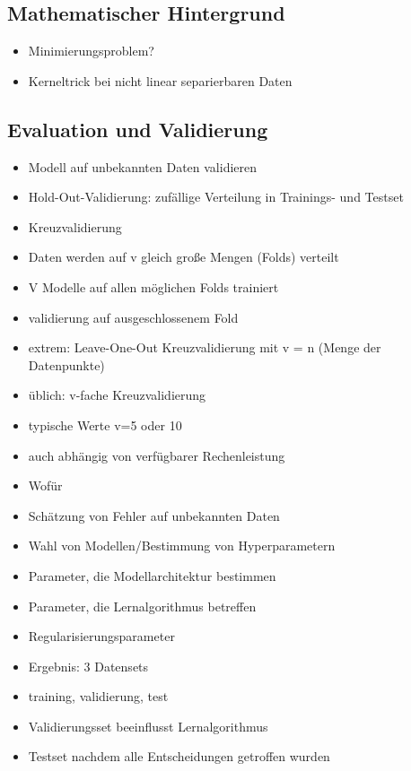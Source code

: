 	\subsection{Mathematischer Hintergrund}
	
	\begin{itemize}
		\item Minimierungsproblem?
		\item Kerneltrick bei nicht linear separierbaren Daten
	\end{itemize}
	
	\subsection{Evaluation und Validierung}
	
	\begin{itemize}
		\item Modell auf unbekannten Daten validieren
		\item Hold-Out-Validierung: zufällige Verteilung in Trainings- und Testset
		\item Kreuzvalidierung
		\item Daten werden auf v gleich große Mengen (Folds) verteilt
		\item V Modelle auf allen möglichen Folds trainiert
		\item validierung auf ausgeschlossenem Fold
		\item extrem: Leave-One-Out Kreuzvalidierung mit v = n (Menge der Datenpunkte)
		\item üblich: v-fache Kreuzvalidierung
		\item typische Werte v=5 oder 10
		\item auch abhängig von verfügbarer Rechenleistung
		\item Wofür
		\item Schätzung von Fehler auf unbekannten Daten
		\item Wahl von Modellen/Bestimmung von Hyperparametern
		\item Parameter, die Modellarchitektur bestimmen
		\item Parameter, die Lernalgorithmus betreffen
		\item Regularisierungsparameter
		\item Ergebnis: 3 Datensets
		\item training, validierung, test
		\item Validierungsset beeinflusst Lernalgorithmus
		\item Testset nachdem alle Entscheidungen getroffen wurden

\end{itemize}
